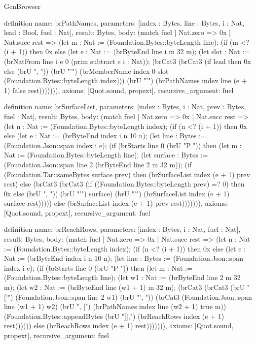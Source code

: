\begin{lexlean}{GenBrowser}
\begin{semanticmodule}
{{definition{
  name: brPathNames,
  parameters: [index : Bytes, line : Bytes, i : Nat, lead : Bool, fuel : Nat],
  result: Bytes,
  body: (match fuel
    | Nat.zero => 0x
    | Nat.succ rest => (let m : Nat := (Foundation.Bytes::byteLength line); (if (m <? (i + 1)) then 0x else (let e : Nat := (brByteEnd line i m 32 m); (let slot : Nat := (brNatFrom line i e 0 (prim subtract e i : Nat)); (brCat3 (brCat3 (if lead then 0x else (brU ", ")) (brU "'") (brMemberName index 0 slot (Foundation.Bytes::byteLength index))) (brU "'") (brPathNames index line (e + 1) false rest))))))),
  axioms: [Quot.sound, propext],
  recursive_argument: fuel
}

definition{
  name: brSurfaceList,
  parameters: [index : Bytes, i : Nat, prev : Bytes, fuel : Nat],
  result: Bytes,
  body: (match fuel
    | Nat.zero => 0x
    | Nat.succ rest => (let n : Nat := (Foundation.Bytes::byteLength index); (if (n <? (i + 1)) then 0x else (let e : Nat := (brByteEnd index i n 10 n); (let line : Bytes := (Foundation.Json::span index i e); (if (brStarts line 0 (brU "P ")) then (let m : Nat := (Foundation.Bytes::byteLength line); (let surface : Bytes := (Foundation.Json::span line 2 (brByteEnd line 2 m 32 m)); (if (Foundation.Tar::sameBytes surface prev) then (brSurfaceList index (e + 1) prev rest) else (brCat3 (brCat3 (if ((Foundation.Bytes::byteLength prev) =? 0) then 0x else (brU ", ")) (brU "'") surface) (brU "'") (brSurfaceList index (e + 1) surface rest))))) else (brSurfaceList index (e + 1) prev rest))))))),
  axioms: [Quot.sound, propext],
  recursive_argument: fuel
}

definition{
  name: brReachRows,
  parameters: [index : Bytes, i : Nat, fuel : Nat],
  result: Bytes,
  body: (match fuel
    | Nat.zero => 0x
    | Nat.succ rest => (let n : Nat := (Foundation.Bytes::byteLength index); (if (n <? (i + 1)) then 0x else (let e : Nat := (brByteEnd index i n 10 n); (let line : Bytes := (Foundation.Json::span index i e); (if (brStarts line 0 (brU "P ")) then (let m : Nat := (Foundation.Bytes::byteLength line); (let w1 : Nat := (brByteEnd line 2 m 32 m); (let w2 : Nat := (brByteEnd line (w1 + 1) m 32 m); (brCat3 (brCat3 (brU "  ['") (Foundation.Json::span line 2 w1) (brU "', ")) (brCat3 (Foundation.Json::span line (w1 + 1) w2) (brU ", [") (brPathNames index line (w2 + 1) true m)) (Foundation.Bytes::appendBytes (brU "]],\n") (brReachRows index (e + 1) rest)))))) else (brReachRows index (e + 1) rest))))))),
  axioms: [Quot.sound, propext],
  recursive_argument: fuel
}

}}
\end{semanticmodule}
\end{lexlean}
